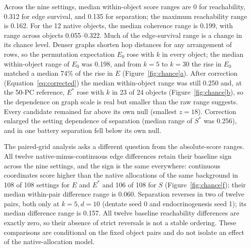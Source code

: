 \documentclass[11pt]{article}
\newcommand{\figpanel}[2]{Figure~\hyperref[#1]{\ref*{#1}#2}}
\begin{document}
Across the nine settings, median within-object score ranges are 0 for reachability, 0.312 for edge survival, and 0.135 for separation; the maximum reachability range is 0.162. For the 12 native objects, the median coherence range is 0.199, with range across objects 0.055--0.322. Much of the edge-survival range is a change in its chance level. Denser graphs shorten hop distances for any arrangement of rows, so the permutation expectation $E_0$ rose with $k$ in every object; the median within-object range of $E_0$ was 0.198, and from $k=5$ to $k=30$ the rise in $E_0$ matched a median 74\% of the rise in $E$ (\figpanel{fig:chance}{a}). After correction (Equation~\ref{eq:corrected}) the median within-object range was still 0.250 and, at the 50-PC reference, $E^*$ rose with $k$ in 23 of 24 objects (\figpanel{fig:chance}{b}), so the dependence on graph scale is real but smaller than the raw range suggests. Every candidate remained far above its own null (smallest $z=18$). Correction enlarged the setting dependence of separation (median range of $S^*$ was 0.256), and in one battery separation fell below its own null.

The paired-grid analysis asks a different question from the absolute-score ranges. All twelve native-minus-continuous edge differences retain their baseline sign across the nine settings, and the sign is the same everywhere: continuous coordinates score higher than the native allocations of the same background in 108 of 108 settings for $E$ and $E^*$ and 106 of 108 for $S$ (\figpanel{fig:chance}{f}); their median within-pair difference range is 0.060. Separation reverses in two of twelve pairs, both only at $k=5,d=10$ (dentate seed 0 and endocrinogenesis seed 1); its median difference range is 0.157. All twelve baseline reachability differences are exactly zero, so their absence of strict reversals is not a stable ordering. These comparisons are conditional on the fixed object pairs and do not isolate an effect of the native-allocation model.
\end{document}
